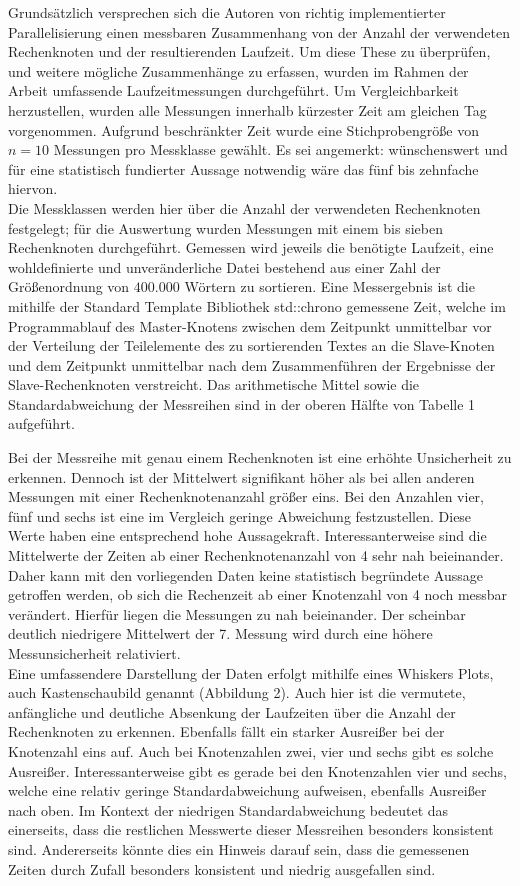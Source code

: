 Grundsätzlich versprechen sich die Autoren von richtig implementierter Parallelisierung einen messbaren Zusammenhang von der Anzahl der verwendeten Rechenknoten und der resultierenden Laufzeit.
Um diese These zu überprüfen, und weitere mögliche Zusammenhänge zu erfassen, wurden im Rahmen der Arbeit umfassende Laufzeitmessungen durchgeführt.
Um Vergleichbarkeit herzustellen, wurden alle Messungen innerhalb kürzester Zeit am gleichen Tag vorgenommen. Aufgrund beschränkter Zeit wurde eine Stichprobengröße von $n = 10$ Messungen pro Messklasse gewählt.
Es sei angemerkt: wünschenswert und für eine statistisch fundierter Aussage notwendig wäre das fünf bis zehnfache hiervon. \\
Die Messklassen werden hier über die Anzahl der verwendeten Rechenknoten festgelegt; für die Auswertung wurden Messungen mit einem bis sieben Rechenknoten durchgeführt.
Gemessen wird jeweils die benötigte Laufzeit, eine wohldefinierte und unveränderliche Datei bestehend aus einer Zahl der Größenordnung von $400.000$ Wörtern zu sortieren.
Eine Messergebnis ist die mithilfe der Standard Template Bibliothek std::chrono gemessene Zeit, welche im Programmablauf des Master-Knotens zwischen dem Zeitpunkt unmittelbar vor der Verteilung der Teilelemente 
des zu sortierenden Textes an die Slave-Knoten und dem Zeitpunkt unmittelbar nach dem Zusammenführen der Ergebnisse der Slave-Rechenknoten verstreicht.
Das arithmetische Mittel sowie die Standardabweichung der Messreihen sind in der oberen Hälfte von Tabelle 1 aufgeführt.

Bei der Messreihe mit genau einem Rechenknoten ist eine erhöhte Unsicherheit zu erkennen. Dennoch ist der Mittelwert signifikant höher als bei allen anderen 
Messungen mit einer Rechenknotenanzahl größer eins. Bei den Anzahlen vier, fünf und sechs ist eine im Vergleich geringe Abweichung festzustellen. Diese Werte haben eine entsprechend hohe 
Aussagekraft. Interessanterweise sind die Mittelwerte der Zeiten ab einer Rechenknotenanzahl von 4 sehr nah beieinander. Daher kann mit den vorliegenden Daten keine statistisch begründete Aussage getroffen werden, ob sich die Rechenzeit ab einer Knotenzahl von 4 noch messbar verändert. Hierfür liegen die Messungen zu nah beieinander. Der scheinbar deutlich niedrigere Mittelwert der 7. Messung wird durch eine
höhere Messunsicherheit relativiert.
\\
Eine umfassendere Darstellung der Daten erfolgt mithilfe eines Whiskers Plots, auch Kastenschaubild genannt (Abbildung 2). Auch hier ist die vermutete, anfängliche und deutliche 
Absenkung der Laufzeiten über die Anzahl der Rechenknoten zu erkennen. Ebenfalls fällt ein starker Ausreißer bei der Knotenzahl eins auf. Auch bei Knotenzahlen zwei, vier und sechs 
gibt es solche Ausreißer. Interessanterweise gibt es gerade bei den Knotenzahlen vier und sechs, welche eine relativ geringe Standardabweichung aufweisen, ebenfalls Ausreißer nach oben. 
Im Kontext der niedrigen Standardabweichung bedeutet das einerseits, dass die restlichen Messwerte dieser Messreihen besonders konsistent sind. Andererseits könnte dies ein Hinweis darauf sein, dass die gemessenen Zeiten durch Zufall besonders konsistent und niedrig ausgefallen sind.

